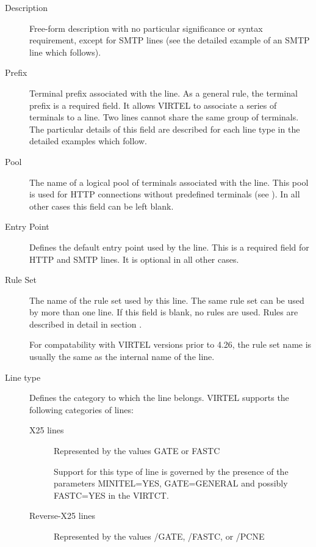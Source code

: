 \documentclass[letterpaper,10pt,english]{sphinxmanual}
\begin{document}
\begin{description}
\begin{description}
\end{description}

\item[{Description}] \leavevmode
Free-form description with no particular significance or syntax requirement, except for SMTP lines (see the detailed example of an SMTP line which follows).

\item[{Prefix}] \leavevmode
Terminal prefix associated with the line. As a general rule, the terminal prefix is a required field. It allows VIRTEL to associate a series of terminals to a line. Two lines cannot share the same group of terminals. The particular details of this field are described for each line type in the detailed examples which follow.

\item[{Pool}] \leavevmode
The name of a logical pool of terminals associated with the line. This pool is used for HTTP connections without predefined terminals
(see {\hyperref[\detokenize{connectivity_guide:v457cn-forceluname}]{}}). In all other cases this field can be left blank.

\item[{Entry Point}] \leavevmode
Defines the default entry point used by the line. This is a required field for HTTP and SMTP lines. It is optional in all other cases.

\item[{Rule Set}] \leavevmode
The name of the rule set used by this line. The same rule set can be used by more than one line. If this field is blank, no rules are used. Rules are described in detail in section .

For compatability with VIRTEL versions prior to 4.26, the rule set name is usually the same as the internal name of the line.

\item[{Line type}] \leavevmode
Defines the category to which the line belongs. VIRTEL supports the following categories of lines:
\begin{description}
\item[{X25 lines}] \leavevmode
Represented by the values GATE or FASTC

Support for this type of line is governed by the presence of the
parameters MINITEL=YES, GATE=GENERAL and possibly FASTC=YES in the
VIRTCT.

\item[{Reverse-X25 lines}] \leavevmode
Represented by the values /GATE, /FASTC, or /PCNE


\end{description}
\end{description}
\end{document}
